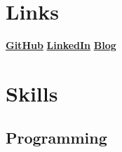 \documentclass[letterpaper]{cv_12} %
\begin{document}

\newpage%
\begin{newpage}


\lastupdated%
\pagecounter%



\begin{minipage}[t]{0.39\textwidth}%


    \section{Links}

    \href{https://github.com/foontzoot}{\bf GitHub} \textbullet{}
    \href{https://www.linkedin.com/in/sinisa-petkovic-b704034/}{\bf LinkedIn} \textbullet{}
    \href{https://sinisapetkovic.com/}{\bf Blog}

    \sectionspace%


    \section{Skills}

    \subsection{Programming}


\end{minipage}
\end{newpage}
\end{document}
